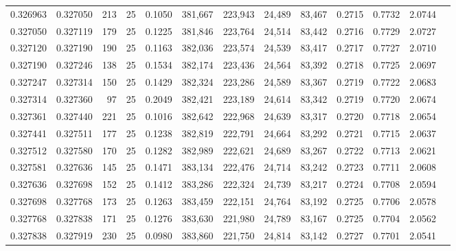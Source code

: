 \begin{tabular}{rrrrrrrrrrrrr}
0.326963 & 0.327050 &   213 &  25 &                                     0.1050 & 381,667 & 223,943 &  24,489 &  83,467 & 0.2715 & 0.7732 & 2.0744 \\
0.327050 & 0.327119 &   179 &  25 &                                     0.1225 & 381,846 & 223,764 &  24,514 &  83,442 & 0.2716 & 0.7729 & 2.0727 \\
0.327120 & 0.327190 &   190 &  25 &                                     0.1163 & 382,036 & 223,574 &  24,539 &  83,417 & 0.2717 & 0.7727 & 2.0710 \\
0.327190 & 0.327246 &   138 &  25 &                                     0.1534 & 382,174 & 223,436 &  24,564 &  83,392 & 0.2718 & 0.7725 & 2.0697 \\
0.327247 & 0.327314 &   150 &  25 &                                     0.1429 & 382,324 & 223,286 &  24,589 &  83,367 & 0.2719 & 0.7722 & 2.0683 \\
0.327314 & 0.327360 &    97 &  25 &                                     0.2049 & 382,421 & 223,189 &  24,614 &  83,342 & 0.2719 & 0.7720 & 2.0674 \\
0.327361 & 0.327440 &   221 &  25 &                                     0.1016 & 382,642 & 222,968 &  24,639 &  83,317 & 0.2720 & 0.7718 & 2.0654 \\
0.327441 & 0.327511 &   177 &  25 &                                     0.1238 & 382,819 & 222,791 &  24,664 &  83,292 & 0.2721 & 0.7715 & 2.0637 \\
0.327512 & 0.327580 &   170 &  25 &                                     0.1282 & 382,989 & 222,621 &  24,689 &  83,267 & 0.2722 & 0.7713 & 2.0621 \\
0.327581 & 0.327636 &   145 &  25 &                                     0.1471 & 383,134 & 222,476 &  24,714 &  83,242 & 0.2723 & 0.7711 & 2.0608 \\
0.327636 & 0.327698 &   152 &  25 &                                     0.1412 & 383,286 & 222,324 &  24,739 &  83,217 & 0.2724 & 0.7708 & 2.0594 \\
0.327698 & 0.327768 &   173 &  25 &                                     0.1263 & 383,459 & 222,151 &  24,764 &  83,192 & 0.2725 & 0.7706 & 2.0578 \\
0.327768 & 0.327838 &   171 &  25 &                                     0.1276 & 383,630 & 221,980 &  24,789 &  83,167 & 0.2725 & 0.7704 & 2.0562 \\
0.327838 & 0.327919 &   230 &  25 &                                     0.0980 & 383,860 & 221,750 &  24,814 &  83,142 & 0.2727 & 0.7701 & 2.0541 \\

\end{tabular}

